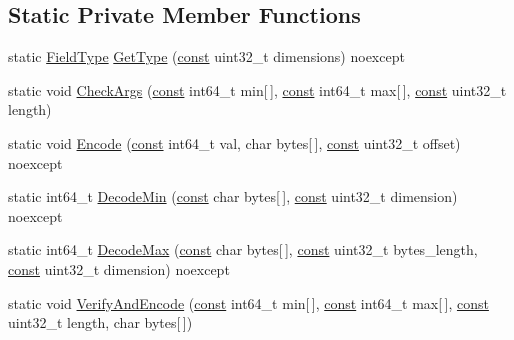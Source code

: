 \subsection*{Static Private Member Functions}
\begin{DoxyCompactItemize}
\item 
static \mbox{\hyperlink{classlucene_1_1core_1_1document_1_1FieldType}{Field\+Type}} \mbox{\hyperlink{classlucene_1_1core_1_1document_1_1LongRange_a57ee0b920b7c4103d4ac63511762deb9}{Get\+Type}} (\mbox{\hyperlink{ZlibCrc32_8h_a2c212835823e3c54a8ab6d95c652660e}{const}} uint32\+\_\+t dimensions) noexcept
\item 
static void \mbox{\hyperlink{classlucene_1_1core_1_1document_1_1LongRange_aa40ee6dae88377490b2ee570d9ff84bf}{Check\+Args}} (\mbox{\hyperlink{ZlibCrc32_8h_a2c212835823e3c54a8ab6d95c652660e}{const}} int64\+\_\+t min\mbox{[}$\,$\mbox{]}, \mbox{\hyperlink{ZlibCrc32_8h_a2c212835823e3c54a8ab6d95c652660e}{const}} int64\+\_\+t max\mbox{[}$\,$\mbox{]}, \mbox{\hyperlink{ZlibCrc32_8h_a2c212835823e3c54a8ab6d95c652660e}{const}} uint32\+\_\+t length)
\item 
static void \mbox{\hyperlink{classlucene_1_1core_1_1document_1_1LongRange_a3b63010820b45954c66489d43ee75321}{Encode}} (\mbox{\hyperlink{ZlibCrc32_8h_a2c212835823e3c54a8ab6d95c652660e}{const}} int64\+\_\+t val, char bytes\mbox{[}$\,$\mbox{]}, \mbox{\hyperlink{ZlibCrc32_8h_a2c212835823e3c54a8ab6d95c652660e}{const}} uint32\+\_\+t offset) noexcept
\item 
static int64\+\_\+t \mbox{\hyperlink{classlucene_1_1core_1_1document_1_1LongRange_ac11a9f4800961cf1edaad2ba9d77c5f5}{Decode\+Min}} (\mbox{\hyperlink{ZlibCrc32_8h_a2c212835823e3c54a8ab6d95c652660e}{const}} char bytes\mbox{[}$\,$\mbox{]}, \mbox{\hyperlink{ZlibCrc32_8h_a2c212835823e3c54a8ab6d95c652660e}{const}} uint32\+\_\+t dimension) noexcept
\item 
static int64\+\_\+t \mbox{\hyperlink{classlucene_1_1core_1_1document_1_1LongRange_ae16e60bb4f29ab3c1b2a2261addbbe50}{Decode\+Max}} (\mbox{\hyperlink{ZlibCrc32_8h_a2c212835823e3c54a8ab6d95c652660e}{const}} char bytes\mbox{[}$\,$\mbox{]}, \mbox{\hyperlink{ZlibCrc32_8h_a2c212835823e3c54a8ab6d95c652660e}{const}} uint32\+\_\+t bytes\+\_\+length, \mbox{\hyperlink{ZlibCrc32_8h_a2c212835823e3c54a8ab6d95c652660e}{const}} uint32\+\_\+t dimension) noexcept
\item 
static void \mbox{\hyperlink{classlucene_1_1core_1_1document_1_1LongRange_acc112551134a7e54e9480e3ef5dca2d0}{Verify\+And\+Encode}} (\mbox{\hyperlink{ZlibCrc32_8h_a2c212835823e3c54a8ab6d95c652660e}{const}} int64\+\_\+t min\mbox{[}$\,$\mbox{]}, \mbox{\hyperlink{ZlibCrc32_8h_a2c212835823e3c54a8ab6d95c652660e}{const}} int64\+\_\+t max\mbox{[}$\,$\mbox{]}, \mbox{\hyperlink{ZlibCrc32_8h_a2c212835823e3c54a8ab6d95c652660e}{const}} uint32\+\_\+t length, char bytes\mbox{[}$\,$\mbox{]})
\end{DoxyCompactItemize}
